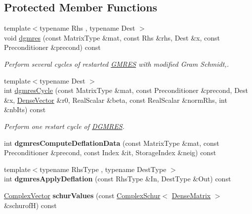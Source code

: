 \subsection*{Protected Member Functions}
\begin{DoxyCompactItemize}
\item 
{\footnotesize template$<$typename Rhs , typename Dest $>$ }\\void \hyperlink{class_eigen_1_1_d_g_m_r_e_s_a1b06062ec16932d3a20ea4767d9de51d}{dgmres} (const Matrix\+Type \&mat, const Rhs \&rhs, Dest \&x, const Preconditioner \&precond) const
\begin{DoxyCompactList}\small\item\em Perform several cycles of restarted \hyperlink{group___iterative_linear_solvers___module_class_eigen_1_1_g_m_r_e_s}{G\+M\+R\+ES} with modified Gram Schmidt,. \end{DoxyCompactList}\item 
{\footnotesize template$<$typename Dest $>$ }\\int \hyperlink{class_eigen_1_1_d_g_m_r_e_s_a151b188720b20e13e8e6b112a8bcc167}{dgmres\+Cycle} (const Matrix\+Type \&mat, const Preconditioner \&precond, Dest \&x, \hyperlink{group___core___module}{Dense\+Vector} \&r0, Real\+Scalar \&beta, const Real\+Scalar \&norm\+Rhs, int \&nb\+Its) const
\begin{DoxyCompactList}\small\item\em Perform one restart cycle of \hyperlink{class_eigen_1_1_d_g_m_r_e_s}{D\+G\+M\+R\+ES}. \end{DoxyCompactList}\item 
\mbox{\label{class_eigen_1_1_d_g_m_r_e_s_a36699b7bd6b1aa852e132c04697124e2}} 
int {\bfseries dgmres\+Compute\+Deflation\+Data} (const Matrix\+Type \&mat, const Preconditioner \&precond, const Index \&it, Storage\+Index \&neig) const
\item 
\mbox{\label{class_eigen_1_1_d_g_m_r_e_s_a7d61cd7c5f5d4f47714d124cc3c192c3}} 
{\footnotesize template$<$typename Rhs\+Type , typename Dest\+Type $>$ }\\int {\bfseries dgmres\+Apply\+Deflation} (const Rhs\+Type \&In, Dest\+Type \&Out) const
\item 
\mbox{\label{class_eigen_1_1_d_g_m_r_e_s_a92363374b8dbe7832b2b7560362c47e7}} 
\hyperlink{group___core___module_class_eigen_1_1_matrix}{Complex\+Vector} {\bfseries schur\+Values} (const \hyperlink{group___eigenvalues___module_class_eigen_1_1_complex_schur}{Complex\+Schur}$<$ \hyperlink{group___core___module}{Dense\+Matrix} $>$ \&schurofH) const

\end{DoxyCompactItemize}
